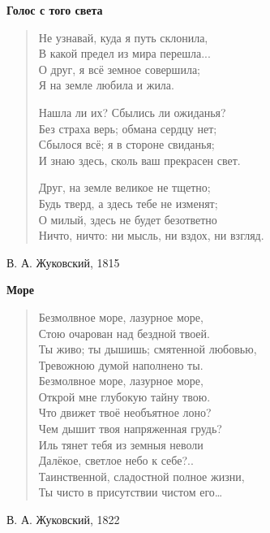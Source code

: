 \documentclass{beamer}
\begin{document}
\begin{frame}

\begin{center}
\textbf{Голос с того света}
\end{center}

\begin{verse}
Не узнавай, куда я путь склонила,\\
В какой предел из мира перешла...\\
О друг, я всё земное совершила;\\
Я на земле любила и жила.

	Нашла ли их? Сбылись ли ожиданья?\\
Без страха верь; обмана сердцу нет;\\
Сбылося всё; я в стороне свиданья;\\
И знаю здесь, сколь ваш прекрасен свет.

	Друг, на земле великое не тщетно;\\
Будь тверд, а здесь тебе не изменят;\\
О милый, здесь не будет безответно\\
Ничто, ничто: ни мысль, ни вздох, ни взгляд.
\end{verse}

В. А. Жуковский, 1815

\end{frame}


\begin{frame}

\begin{center}
\textbf{Море}
\end{center}

\begin{verse}

Безмолвное море, лазурное море,\\
Стою очарован над бездной твоей.\\
Ты живо; ты дышишь; смятенной любовью,\\
Тревожною думой наполнено ты.\\
Безмолвное море, лазурное море,\\
Открой мне глубокую тайну твою.\\
Что движет твоё необъятное лоно?\\
Чем дышит твоя напряженная грудь?\\
Иль тянет тебя из земныя неволи\\
Далёкое, светлое небо к себе?..\\
Таинственной, сладостной полное жизни,\\
Ты чисто в присутствии чистом его\dots


\end{verse}

В. А. Жуковский, 1822

\end{frame}
\end{document}
